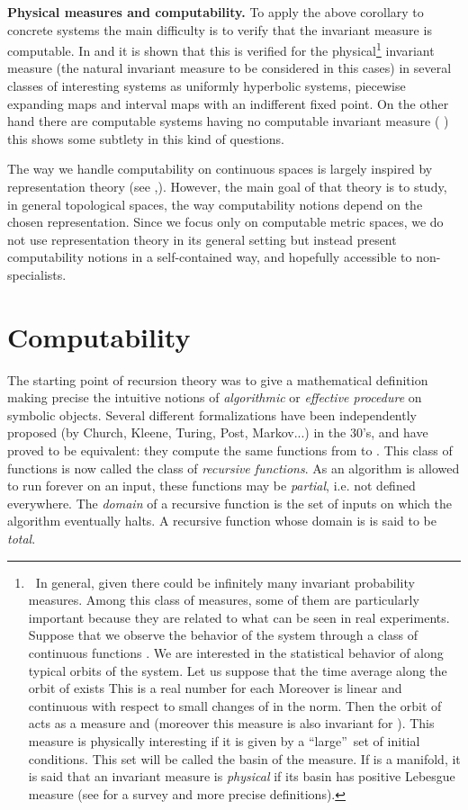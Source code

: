 \documentclass[copyright,creativecommons]{eptcs}
\numberwithin{equation}{section}
\begin{document}
\noindent \textbf{Physical measures and computability. }To apply the above
corollary to concrete systems the main difficulty is to verify that the
invariant measure is computable. In \cite{GHR07} and \cite{GalHoyRoj3} it is
shown that this is verified for the physical\footnote{\textbf{\ }In general,
given  there could be infinitely many invariant probability measures.
Among this class of measures, some of them are particularly important
because they are related to what can be seen in real experiments. Suppose
that we observe the behavior of the system  through a class of
continuous functions . We are interested in
the statistical behavior of  along typical orbits of the system. Let
us suppose that the time average along the orbit of  exists
This is a real number for each  Moreover  is linear
and continuous with respect to small changes of  in the  norm.
Then the orbit of  acts as a measure  and  (moreover this measure is also invariant for ). This measure is physically interesting if it is given by a
\textquotedblleft large\textquotedblright\ set of initial conditions. This
set will be called the basin of the measure. If  is a manifold, it is
said that an invariant measure is \emph{physical} if its basin has positive
Lebesgue measure (see \cite{Y} for a survey and more precise definitions).}
invariant measure (the natural invariant measure to be considered in this
cases) in several classes of interesting systems as uniformly hyperbolic
systems, piecewise expanding maps and interval maps with an indifferent
fixed point. On the other hand there are computable systems having no
computable invariant measure ( \cite{GalHoyRoj3}) this shows some subtlety in this kind of
questions.

The way we handle computability on continuous spaces is largely inspired by
representation theory (see \cite{Wei00},\cite{BHW}). However, the main goal
of that theory is to study, in general topological spaces, the way
computability notions depend on the chosen representation. Since we focus
only on computable metric spaces, we do not use representation theory in its
general setting but instead present computability notions in a
self-contained way, and hopefully accessible to non-specialists.

\section{Computability}

The starting point of recursion theory was to give a mathematical definition
making precise the intuitive notions of \emph{algorithmic} or \emph{effective procedure} on symbolic objects. Several different formalizations
have been independently proposed (by Church, Kleene, Turing, Post,
Markov...) in the 30's, and have proved to be equivalent: they compute the
same functions from  to . This class of functions is
now called the class of \emph{recursive functions}. As an algorithm is
allowed to run forever on an input, these functions may be \emph{partial},
i.e. not defined everywhere. The \emph{domain} of a recursive function is
the set of inputs on which the algorithm eventually halts. A recursive
function whose domain is  is said to be \emph{total}.
\end{document}
